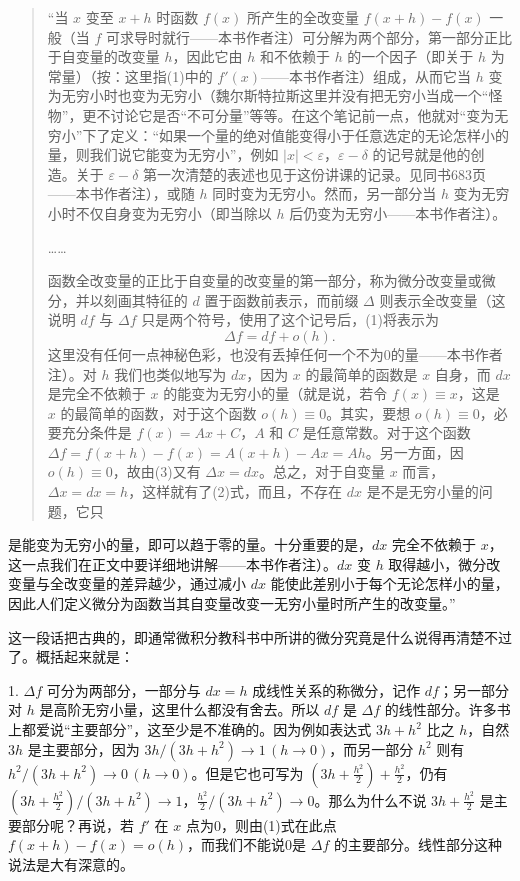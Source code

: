 \begin{quote}
“当 $x$ 变至 $x+h$ 时函数 $f(x)$ 所产生的全改变量 $f(x+h)-f(x)$ 一般（当 $f$ 可求导时就行——本书作者注）可分解为两个部分，第一部分正比于自变量的改变量 $h$，因此它由 $h$ 和不依赖于 $h$ 的一个因子（即关于 $h$ 为常量）（按：这里指(1)中的 $f'(x)$——本书作者注）组成，从而它当 $h$ 变为无穷小时也变为无穷小（魏尔斯特拉斯这里并没有把无穷小当成一个“怪物”，更不讨论它是否“不可分量”等等。在这个笔记前一点，他就对“变为无穷小”下了定义：“如果一个量的绝对值能变得小于任意选定的无论怎样小的量，则我们说它能变为无穷小”，例如 $|x|<\varepsilon$，$\varepsilon-\delta$ 的记号就是他的创造。关于 $\varepsilon-\delta$ 第一次清楚的表述也见于这份讲课的记录。见同书683页——本书作者注），或随 $h$ 同时变为无穷小。然而，另一部分当 $h$ 变为无穷小时不仅自身变为无穷小（即当除以 $h$ 后仍变为无穷小——本书作者注）。

……

函数全改变量的正比于自变量的改变量的第一部分，称为微分改变量或微分，并以刻画其特征的 $d$ 置于函数前表示，而前缀 $\Delta$ 则表示全改变量（这说明 $df$ 与 $\Delta f$ 只是两个符号，使用了这个记号后，(1)将表示为
\[
 \Delta f=df+o(h).
\]
这里没有任何一点神秘色彩，也没有丢掉任何一个不为0的量——本书作者注）。对 $h$ 我们也类似地写为 $dx$，因为 $x$ 的最简单的函数是 $x$ 自身，而 $dx$ 是完全不依赖于 $x$ 的能变为无穷小的量（就是说，若令 $f(x)\equiv x$，这是 $x$ 的最简单的函数，对于这个函数 $o(h)\equiv0$。其实，要想 $o(h)\equiv0$，必要充分条件是 $f(x)=Ax+C$，$A$ 和 $C$ 是任意常数。对于这个函数 $\Delta f=f(x+h)-f(x)=A(x+h)-Ax=Ah$。另一方面，因 $o(h)\equiv0$，故由(3)又有 $\Delta x=dx$。总之，对于自变量 $x$ 而言，$\Delta x=dx=h$，这样就有了(2)式，而且，不存在 $dx$ 是不是无穷小量的问题，它只
\end{quote}

\noindent 是能变为无穷小的量，即可以趋于零的量。十分重要的是，$dx$ 完全不依赖于 $x$，这一点我们在正文中要详细地讲解——本书作者注）。$dx$ 变 $h$ 取得越小，微分改变量与全改变量的差异越少，通过减小 $dx$ 能使此差别小于每个无论怎样小的量，因此人们定义微分为函数当其自变量改变一无穷小量时所产生的改变量。”

这一段话把古典的，即通常微积分教科书中所讲的微分究竟是什么说得再清楚不过了。概括起来就是：

1. $\Delta f$ 可分为两部分，一部分与 $dx=h$ 成线性关系的称微分，记作 $df$；另一部分对 $h$ 是高阶无穷小量，这里什么都没有舍去。所以 $df$ 是 $\Delta f$ 的线性部分。许多书上都爱说“主要部分”，这至少是不准确的。因为例如表达式 $3h+h^2$ 比之 $h$，自然 $3h$ 是主要部分，因为 $3h/(3h+h^2)\to1\,(h\to0)$，而另一部分 $h^2$ 则有 $h^2/(3h+h^2)\to0\,(h\to0)$。但是它也可写为 $\left(3h+\frac{h^2}{2}\right)+\frac{h^2}{2}$，仍有 $\left(3h+\frac{h^2}{2}\right)/(3h+h^2)\to1$，$\frac{h^2}{2}/(3h+h^2)\to0$。那么为什么不说 $3h+\frac{h^2}{2}$ 是主要部分呢？再说，若 $f'$ 在 $x$ 点为0，则由(1)式在此点 $f(x+h)-f(x)=o(h)$，而我们不能说0是 $\Delta f$ 的主要部分。线性部分这种说法是大有深意的。

